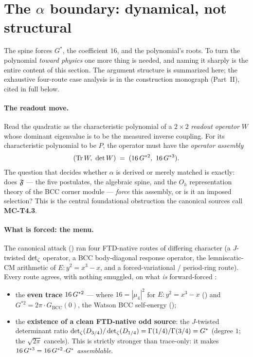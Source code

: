 \section{The \texorpdfstring{$\alpha$}{alpha} boundary: dynamical, not structural}
\label{sec:math-boundary}

The spine forces $G^{*}$, the coefficient $16$, and the polynomial's roots. To
turn the polynomial \emph{toward physics} one more thing is needed, and naming
it sharply is the entire content of this section. The argument structure is
summarized here; the exhaustive four-route case analysis is in the construction
monograph (Part~II), cited in full below.

\paragraph{The readout move.} Read the quadratic as the characteristic
polynomial of a $2\times2$ \emph{readout operator} $W$ whose dominant eigenvalue
is to be the measured inverse coupling. For its characteristic polynomial to be
$P$, the operator must have the \emph{operator assembly}
\[
  (\operatorname{Tr} W,\ \det W) \;=\; (16\,G^{*2},\ 16\,G^{*3}).
\]
The question that decides whether $\alpha$ is derived or merely matched is
exactly: does $\mathfrak{F}$ --- the five postulates, the algebraic spine, and the
$O_h$ representation theory of the BCC corner module --- \emph{force} this
assembly, or is it an imposed selection? This is the central foundational
obstruction the canonical sources call \textbf{MC-T4.3}.

\paragraph{What is forced: the menu.} The canonical attack ()
ran four FTD-native routes of differing character (a $J$-twisted
$\operatorname{det}\nolimits_{\zeta}$ operator, a BCC body-diagonal response operator, the lemniscatic-CM
arithmetic of $E:y^{2}=x^{3}-x$, and a forced-variational / period-ring route).
Every route agrees, with nothing smuggled, on what \emph{is} forward-forced
:
\begin{itemize}[leftmargin=1.4em, itemsep=2pt]
  \item the \textbf{even trace} $16\,G^{*2}$ --- where $16=|\mu_4|^{2}$ for
    $E:y^{2}=x^{3}-x$ () and $G^{*2}=2\pi\!\cdot\!G_{\mathrm{BCC}}(0)$,
    the Watson BCC self-energy ();
  \item the \textbf{existence of a clean FTD-native odd source}: the $J$-twisted
    determinant ratio $\operatorname{det}\nolimits_{\zeta}(D_{3/4})/\operatorname{det}\nolimits_{\zeta}(D_{1/4})=\Gamma(1/4)/\Gamma(3/4)=G^{*}$
    (degree $1$; the $\sqrt{2\pi}$ cancels). This is strictly stronger than
    trace-only: it makes $16\,G^{*3}=16\,G^{*2}\!\cdot\!G^{*}$ \emph{assemblable}.
\end{itemize}

